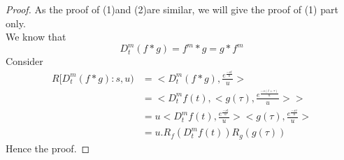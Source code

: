 \begin{proof}
As the proof of (1)and (2)are similar, we will give the proof of (1) part only.\\
We know that
\begin{equation}
D^{m}_{t}(f \ast g)=f^{m} \ast g=g \ast f^{m}
\end{equation}
Consider
\begin{align*}
R[D^{m}_{t}(f \ast g):s,u)&=<D^{m}_{t}(f \ast g),\frac{e^{\frac{-st}{u}}}{u}>\\
&=<D^{m}_{t}f(t),<g(\tau),\frac{e^{\frac{-s(t+\tau)}{u}}}{u}>>\\
&=u<D^{m}_{t}f(t),\frac{e^{\frac{-st}{u}}}{u}><g(\tau),\frac{e^{\frac{-s\tau}{u}}}{u}>\\
&=u.R_{f}(D^{m}_{t}f(t))R_{g}(g(\tau))
\end{align*}
Hence the proof.
 \end{proof}

